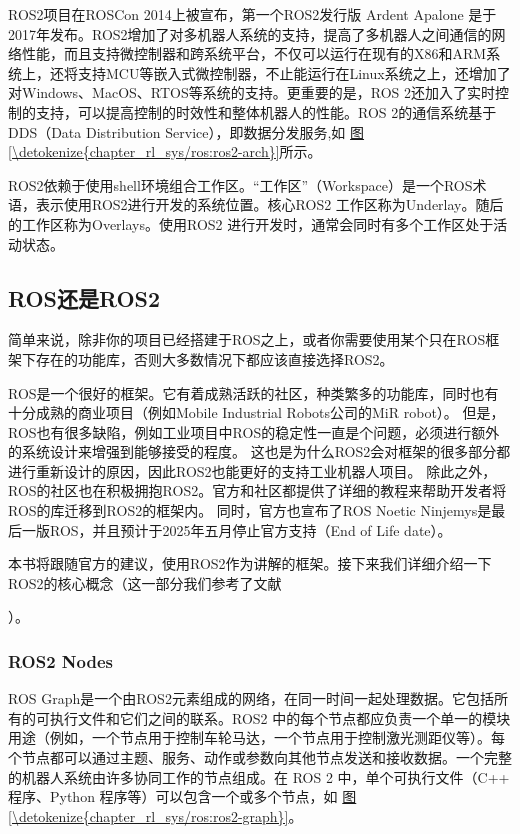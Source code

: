 \documentclass[letterpaper,10pt,english]{sphinxmanual}
\begin{document}
\sphinxAtStartPar
ROS2项目在ROSCon 2014上被宣布，第一个ROS2发行版 Ardent Apalone
是于2017年发布。ROS2增加了对多机器人系统的支持，提高了多机器人之间通信的网络性能，而且支持微控制器和跨系统平台，不仅可以运行在现有的X86和ARM系统上，还将支持MCU等嵌入式微控制器，不止能运行在Linux系统之上，还增加了对Windows、MacOS、RTOS等系统的支持。更重要的是，ROS
2还加入了实时控制的支持，可以提高控制的时效性和整体机器人的性能。ROS
2的通信系统基于DDS（Data Distribution Service），即数据分发服务,如
\hyperref[\detokenize{chapter_rl_sys/ros:ros2-arch}]{图\ref{\detokenize{chapter_rl_sys/ros:ros2-arch}}}所示。

\sphinxAtStartPar
ROS2依赖于使用shell环境组合工作区。“工作区”（Workspace）是一个ROS术语，表示使用ROS2进行开发的系统位置。核心ROS2
工作区称为Underlay。随后的工作区称为Overlays。使用ROS2
进行开发时，通常会同时有多个工作区处于活动状态。


\subsection{ROS还是ROS2}
\label{\detokenize{chapter_rl_sys/ros:rosros2}}
\sphinxAtStartPar
简单来说，除非你的项目已经搭建于ROS之上，或者你需要使用某个只在ROS框架下存在的功能库，否则大多数情况下都应该直接选择ROS2。

\sphinxAtStartPar
ROS是一个很好的框架。它有着成熟活跃的社区，种类繁多的功能库，同时也有十分成熟的商业项目（例如Mobile
Industrial Robots公司的MiR robot）。
但是，ROS也有很多缺陷，例如工业项目中ROS的稳定性一直是个问题，必须进行额外的系统设计来增强到能够接受的程度。
这也是为什么ROS2会对框架的很多部分都进行重新设计的原因，因此ROS2也能更好的支持工业机器人项目。
除此之外，ROS的社区也在积极拥抱ROS2。官方和社区都提供了详细的教程来帮助开发者将ROS的库迁移到ROS2的框架内。
同时，官方也宣布了ROS Noetic
Ninjemys是最后一版ROS，并且预计于2025年五月停止官方支持（End of Life
date）。

\sphinxAtStartPar
本书将跟随官方的建议，使用ROS2作为讲解的框架。接下来我们详细介绍一下ROS2的核心概念（这一部分我们参考了文献  \sphinxstepexplicit %
\begin{footnote}[1]\label{\thesphinxscope.1}%
\sphinxAtStartFootnote
{}
%
\end{footnote}）。


\subsubsection{ROS2 Nodes}
\label{\detokenize{chapter_rl_sys/ros:ros2-nodes}}
\sphinxAtStartPar
ROS
Graph是一个由ROS2元素组成的网络，在同一时间一起处理数据。它包括所有的可执行文件和它们之间的联系。ROS2
中的每个节点都应负责一个单一的模块用途（例如，一个节点用于控制车轮马达，一个节点用于控制激光测距仪等）。每个节点都可以通过主题、服务、动作或参数向其他节点发送和接收数据。一个完整的机器人系统由许多协同工作的节点组成。在
ROS 2 中，单个可执行文件（C++ 程序、Python
程序等）可以包含一个或多个节点，如 \hyperref[\detokenize{chapter_rl_sys/ros:ros2-graph}]{图\ref{\detokenize{chapter_rl_sys/ros:ros2-graph}}}。
\end{document}
